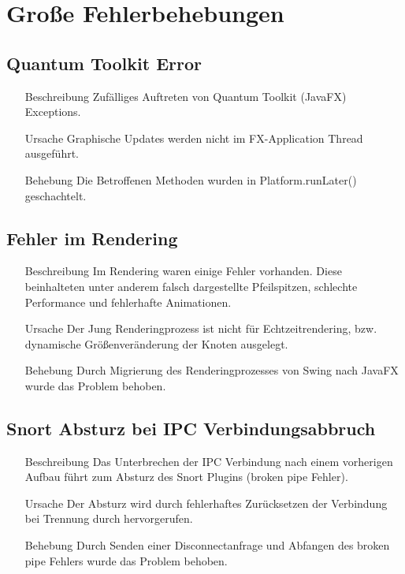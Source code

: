 \chapter{Große Fehlerbehebungen}


\section{Quantum Toolkit Error}

\begin{enumerate}[leftmargin = *, align=parleft, labelsep=3cm]
  \item[Beschreibung]
    Zufälliges Auftreten von Quantum Toolkit (JavaFX) Exceptions.
  \item[Ursache]
    Graphische Updates werden nicht im FX-Application Thread ausgeführt.
  \item[Behebung]
    Die Betroffenen Methoden wurden in Platform.runLater() geschachtelt.
\end{enumerate}

\section{Fehler im Rendering}

\begin{enumerate}[leftmargin = *, align=parleft, labelsep=3cm]
  \item[Beschreibung]
    Im Rendering waren einige Fehler vorhanden. Diese beinhalteten unter anderem falsch dargestellte Pfeilspitzen, schlechte Performance und fehlerhafte Animationen.
  \item[Ursache]
    Der Jung Renderingprozess ist nicht für Echtzeitrendering, bzw. dynamische Größenveränderung der Knoten ausgelegt.
  \item[Behebung]
    Durch Migrierung des Renderingprozesses von Swing nach JavaFX wurde das Problem behoben.
\end{enumerate}

\section{Snort Absturz bei IPC Verbindungsabbruch}

\begin{enumerate}[leftmargin = *, align=parleft, labelsep=3cm]
  \item[Beschreibung]
    Das Unterbrechen der IPC Verbindung nach einem vorherigen Aufbau führt zum Absturz des Snort Plugins (broken pipe Fehler).
  \item[Ursache]
    Der Absturz wird durch fehlerhaftes Zurücksetzen der Verbindung bei Trennung durch \programname hervorgerufen.
  \item[Behebung]
    Durch Senden einer Disconnectanfrage und Abfangen des broken pipe Fehlers wurde das Problem behoben.
\end{enumerate}